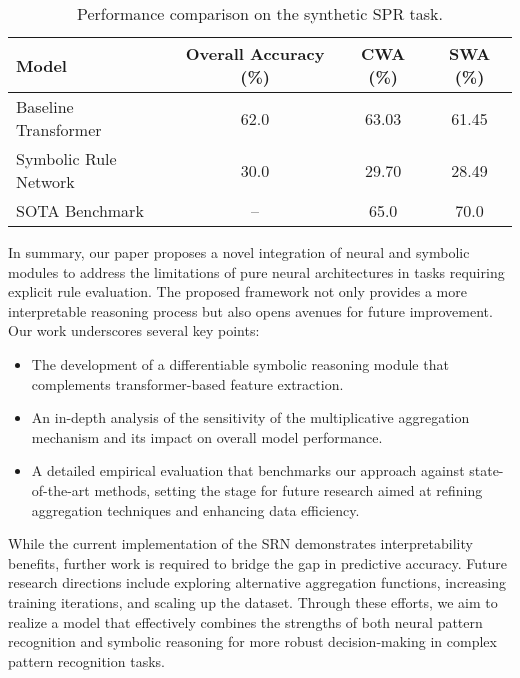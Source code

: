 \documentclass[11pt]{article}
\begin{document}
\begin{table}[h]
\centering
\begin{tabular}{lccc}
\hline
\textbf{Model} & \textbf{Overall Accuracy (\%)} & \textbf{CWA (\%)} & \textbf{SWA (\%)} \\
\hline
Baseline Transformer & 62.0 & 63.03 & 61.45 \\
Symbolic Rule Network & 30.0 & 29.70 & 28.49 \\
SOTA Benchmark & -- & 65.0 & 70.0 \\
\hline
\end{tabular}
\caption{Performance comparison on the synthetic SPR task.}
\label{tab:intro_results}
\end{table}

In summary, our paper proposes a novel integration of neural and symbolic modules to address the limitations of pure neural architectures in tasks requiring explicit rule evaluation. The proposed framework not only provides a more interpretable reasoning process but also opens avenues for future improvement. Our work underscores several key points:
\begin{itemize}
    \item The development of a differentiable symbolic reasoning module that complements transformer-based feature extraction.
    \item An in-depth analysis of the sensitivity of the multiplicative aggregation mechanism and its impact on overall model performance.
    \item A detailed empirical evaluation that benchmarks our approach against state-of-the-art methods, setting the stage for future research aimed at refining aggregation techniques and enhancing data efficiency.
\end{itemize}
While the current implementation of the SRN demonstrates interpretability benefits, further work is required to bridge the gap in predictive accuracy. Future research directions include exploring alternative aggregation functions, increasing training iterations, and scaling up the dataset. Through these efforts, we aim to realize a model that effectively combines the strengths of both neural pattern recognition and symbolic reasoning for more robust decision-making in complex pattern recognition tasks.
\end{document}
